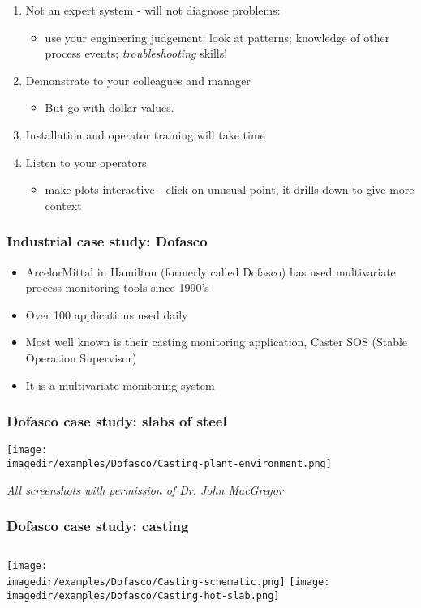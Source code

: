 \begin{frame}[allowframebreaks]
\begin{enumerate}
\begin{itemize}
		\end{itemize}
		\item	Not an expert system - will not diagnose problems:
		\begin{itemize}
			\item	use your engineering judgement; look at patterns; knowledge of other process events; \emph{troubleshooting} skills!
		\end{itemize}
		\item	Demonstrate to your colleagues and manager
		\begin{itemize}
			\item	But go with dollar values.
		\end{itemize}
		\item	Installation and operator training will take time
		\item	Listen to your operators
		\begin{itemize}
			\item	make plots interactive - click on unusual point, it drills-down to give more context
		\end{itemize}
	\end{enumerate}
\end{frame}

\begin{frame}\frametitle{Industrial case study: Dofasco}
	\begin{itemize}
		\item	ArcelorMittal in Hamilton (formerly called Dofasco) has used multivariate process monitoring tools since 1990's
		\item	Over 100 applications used daily
		\item	Most well known is their casting monitoring application, Caster SOS (Stable Operation Supervisor)
		\item	It is a multivariate monitoring system
	\end{itemize}
\end{frame}

\begin{frame}\frametitle{Dofasco case study: slabs of steel}

	\texttt{[image: \\imagedir/examples/Dofasco/Casting-plant-environment.png]}

	\emph{All screenshots with permission of Dr. John MacGregor}
\end{frame}

\begin{frame}\frametitle{Dofasco case study: casting}
	\begin{columns}
		\column{5cm}
		\texttt{[image: \\imagedir/examples/Dofasco/Casting-schematic.png]} \column{5cm}
		\texttt{[image: \\imagedir/examples/Dofasco/Casting-hot-slab.png]}
	\end{columns}
\end{frame}

